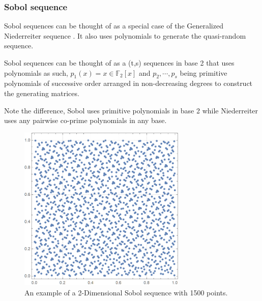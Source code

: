 \documentclass[12pt]{article}
\numberwithin{equation}{section}
\begin{document}
\subsubsection{Sobol sequence} 
Sobol sequences can be thought of as a special case of the Generalized Niederreiter sequence \cite{exactnied, SOBOL196786}. It also uses polynomials to generate the quasi-random sequence.
\par Sobol sequences can be thought of as a (t,s) sequences in base 2 that uses polynomials as such, $p_1(x)=x \in \mathbb{F}_2[x]$ and $p_2, \cdots, p_s$ being primitive polynomials of successive order arranged in non-decreasing degrees to construct the generating matrices.
\par Note the difference, Sobol uses primitive polynomials in base 2 while Niederreiter uses any pairwise co-prime polynomials in any base.
\begin{figure}[!htb]
    \centering
    \includegraphics[width=8cm]{Images/1500sobol.png}
    \caption{An example of a 2-Dimensional Sobol sequence with 1500 points.}
    \label{fig:examplesobol}
\end{figure}
\FloatBarrier
\end{document}
